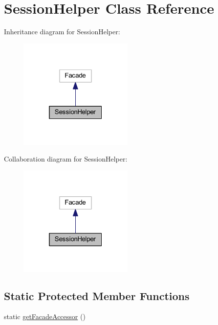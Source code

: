 \hypertarget{classhamburgscleanest_1_1_data_tables_1_1_facades_1_1_session_helper}{}\section{Session\+Helper Class Reference}
\label{classhamburgscleanest_1_1_data_tables_1_1_facades_1_1_session_helper}


Inheritance diagram for Session\+Helper\+:
\nopagebreak
\begin{figure}[H]
\begin{center}
\leavevmode
\includegraphics[width=160pt]{classhamburgscleanest_1_1_data_tables_1_1_facades_1_1_session_helper__inherit__graph}
\end{center}
\end{figure}


Collaboration diagram for Session\+Helper\+:
\nopagebreak
\begin{figure}[H]
\begin{center}
\leavevmode
\includegraphics[width=160pt]{classhamburgscleanest_1_1_data_tables_1_1_facades_1_1_session_helper__coll__graph}
\end{center}
\end{figure}
\subsection*{Static Protected Member Functions}
\begin{DoxyCompactItemize}
\item 
static \hyperlink{classhamburgscleanest_1_1_data_tables_1_1_facades_1_1_session_helper_a19a808201f41f32f71a0532cb49b450f}{get\+Facade\+Accessor} ()
\end{DoxyCompactItemize}


